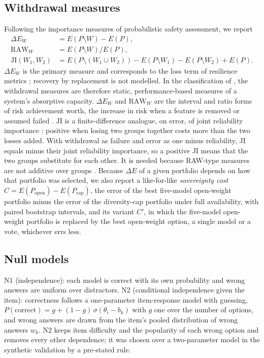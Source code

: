 \documentclass[preprint,12pt,authoryear]{elsarticle}
\newcommand{\dE}{\Delta E}
\begin{document}
\subsection{Withdrawal measures}
Following the importance measures of probabilistic safety assessment, we report
\begin{align}
\dE_W &= E(P\setminus W) - E(P), \\
\mathrm{RAW}_W &= E(P\setminus W)/E(P), \\
\mathrm{JI}(W_1,W_2) &= E(P\setminus(W_1\cup W_2)) - E(P\setminus W_1) - E(P\setminus W_2) + E(P).
\end{align}
$\dE_W$ is the primary measure and corresponds to the loss term of resilience metrics \citep{henry2012}; recovery by replacement is not modelled. In the classification of \citet{hosseini2016}, the withdrawal measures are therefore static, performance-based measures of a system's absorptive capacity. $\dE_W$ and $\mathrm{RAW}_W$ are the interval and ratio forms of risk achievement worth, the increase in risk when a feature is removed or assumed failed \citep{vesely1983}. $\mathrm{JI}$ is a finite-difference analogue, on error, of joint reliability importance \citep{honglie1993}: positive when losing two groups together costs more than the two losses added. With withdrawal as failure and error as one minus reliability, JI equals minus their joint reliability importance, so a positive JI means that the two groups substitute for each other. It is needed because RAW-type measures are not additive over groups \citep{borgonovo2001}. Because $\dE$ of a given portfolio depends on how that portfolio was selected, we also report a like-for-like \emph{sovereignty cost} $C = E(P_{\text{open}}) - E(P_{\text{cap}})$, the error of the best five-model open-weight portfolio minus the error of the diversity-cap portfolio under full availability, with paired bootstrap intervals, and its variant $C'$, in which the five-model open-weight portfolio is replaced by the best open-weight option, a single model or a vote, whichever errs less.

\subsection{Null models}
N1 (independence): each model is correct with its own probability and wrong answers are uniform over distractors. N2 (conditional independence given the item): correctness follows a one-parameter item-response model with guessing, $P(\text{correct}) = g + (1-g)\,\sigma(\theta_i - b_k)$ with $g$ one over the number of options, and wrong answers are drawn from the item's pooled distribution of wrong answers $w_k$. N2 keeps item difficulty and the popularity of each wrong option and removes every other dependence; it was chosen over a two-parameter model in the synthetic validation by a pre-stated rule.
\end{document}
